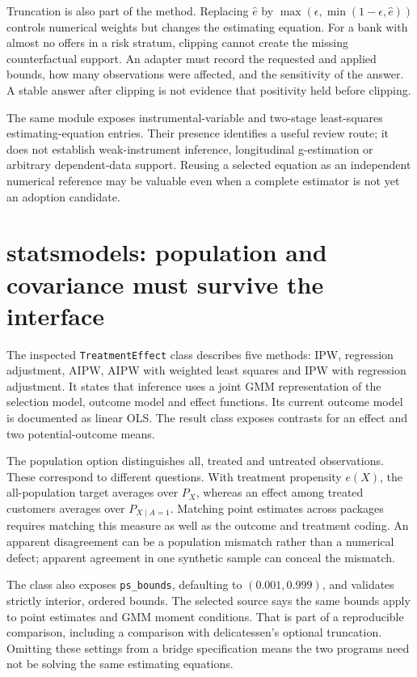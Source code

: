 Truncation is also part of the method. Replacing $\widehat e$ by
$\max(\epsilon,\min(1-\epsilon,\widehat e))$ controls numerical weights but
changes the estimating equation. For a bank with almost no offers in a risk
stratum, clipping cannot create the missing counterfactual support. An adapter
must record the requested and applied bounds, how many observations were
affected, and the sensitivity of the answer. A stable answer after clipping is
not evidence that positivity held before clipping.

The same module exposes instrumental-variable and two-stage least-squares
estimating-equation entries. Their presence identifies a useful review route;
it does not establish weak-instrument inference, longitudinal g-estimation or
arbitrary dependent-data support. Reusing a selected equation as an independent
numerical reference may be valuable even when a complete estimator is not yet
an adoption candidate. \cite{v13_sw_delicatessen}

\section{statsmodels: population and covariance must survive the interface}

The inspected \texttt{TreatmentEffect} class describes five methods: IPW,
regression adjustment, AIPW, AIPW with weighted least squares and IPW with
regression adjustment. It states that inference uses a joint GMM representation
of the selection model, outcome model and effect functions. Its current outcome
model is documented as linear OLS. The result class exposes contrasts for an
effect and two potential-outcome means. \cite{v13_sw_statsmodels}

The population option distinguishes all, treated and untreated observations.
These correspond to different questions. With treatment propensity $e(X)$,
the all-population target averages over $P_X$, whereas an effect among treated
customers averages over $P_{X\mid A=1}$. Matching point estimates across packages
requires matching this measure as well as the outcome and treatment coding.
An apparent disagreement can be a population mismatch rather than a numerical
defect; apparent agreement in one synthetic sample can conceal the mismatch.

The class also exposes \texttt{ps\_bounds}, defaulting to $(0.001,0.999)$, and
validates strictly interior, ordered bounds. The selected source says the same
bounds apply to point estimates and GMM moment conditions. That is part of a
reproducible comparison, including a comparison with delicatessen's optional
truncation. Omitting these settings from a bridge specification means the two
programs need not be solving the same estimating equations.

